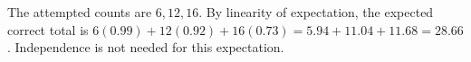 The attempted counts are $6,12,16$. By linearity of expectation, the expected correct total is $6(0.99)+12(0.92)+16(0.73)=5.94+11.04+11.68=\boxed{28.66}$. Independence is not needed for this expectation.
